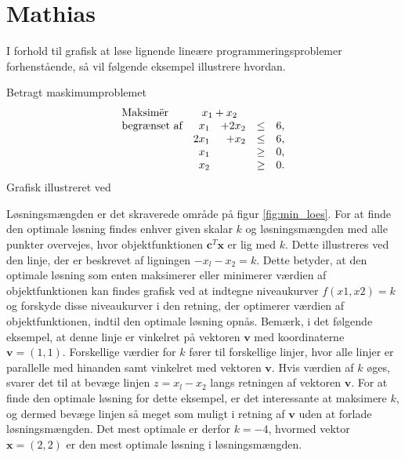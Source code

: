 \section{Mathias}
\label{heeeeejjulle}

I forhold til grafisk at løse lignende lineære programmeringsproblemer forhenstående, så vil følgende eksempel illustrere hvordan. 

\begin{eks}
\label{eks:min_loes}
Betragt maskimumproblemet
%
\begin{align*}
\begin{array}{lrrlr}
\text{Maksimër}		&	\multicolumn{2}{c}{x_1+x_2}  &\\
\text{begrænset af}	&x_1& + 2x_2			&\leq 	& 6,\\
					&2x_1& + x_2			&\leq	& 6,\\
					&x_1&    				&\geq	& 0,\\
					&x_2&    				&\geq	& 0.\\
\end{array}
\end{align*}
%
Grafisk illustreret ved 
%

%
\end{eks}
\noindent
Løsningsmængden er det skraverede område på figur \ref{fig:min_loes}. For at finde den optimale løsning findes enhver given skalar $k$ og løsningsmængden med alle punkter overvejes, hvor objektfunktionen $\textbf{c}^T\textbf{x}$ er lig med $k$. Dette illustreres ved den linje, der er beskrevet af ligningen $-x_l-x_2=k$. Dette betyder, at den optimale løsning som enten maksimerer eller minimerer værdien
af objektfunktionen kan findes grafisk ved at indtegne niveaukurver $f(x1, x2)=k$ og forskyde disse niveaukurver i den retning, der optimerer værdien af objektfunktionen, indtil den optimale løsning opnås.  Bemærk, i det følgende eksempel, at denne linje er vinkelret på vektoren $\textbf{v}$ med koordinaterne $\textbf{v}=(1,1)$.
Forskellige værdier for $k$ fører til forskellige linjer, hvor  alle linjer er parallelle med hinanden samt vinkelret med vektoren $\textbf{v}$. Hvis værdien af $k$ øges, svarer det til at bevæge linjen $z=x_l-x_2$ langs retningen af vektoren $\textbf{v}$. For at finde den optimale løsning for dette eksempel, er det interessante at maksimere $k$, og dermed bevæge linjen så meget som muligt i retning af $\textbf{v}$ uden at forlade løsningsmængden. Det mest optimale er derfor $k = -4$, hvormed vektor $\textbf{x}=(2,2)$ er den mest optimale løsning i løsningsmængden. \\\\
